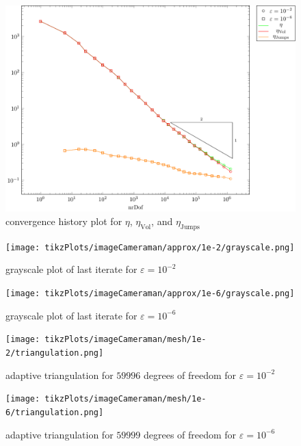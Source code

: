 \documentclass[draft=false,twoside,12pt]{scrreprt}
\begin{document}
\begin{figure}[H]
	\centering
	\includegraphics[width=14cm]
  {tikzPlots/imageCameraman/convergence/eps1e-2And1e-6/fig.pdf}
  \caption{convergence history plot for $\eta$,
  $\eta_\text{Vol}$, and $\eta_\text{Jumps}$}
\end{figure}

\begin{minipage}[t]{0.5\textwidth}
  \begin{figure}[H]
	  \centering
		\texttt{[image: tikzPlots/imageCameraman/approx/1e-2/grayscale.png]}
    \caption{grayscale plot of last iterate for $\varepsilon = 10^{-2}$}
  \end{figure}
\end{minipage}
\begin{minipage}[t]{0.5\textwidth}
  \begin{figure}[H]
	  \centering
		\texttt{[image: tikzPlots/imageCameraman/approx/1e-6/grayscale.png]}
    \caption{grayscale plot of last iterate for $\varepsilon = 10^{-6}$}
  \end{figure}
\end{minipage}

\begin{minipage}[t]{0.5\textwidth}
  \begin{figure}[H]
	  \centering
		\texttt{[image: tikzPlots/imageCameraman/mesh/1e-2/triangulation.png]}
    \caption{adaptive triangulation for $59996$ degrees of freedom for
      $\varepsilon = 10^{-2}$}
  \end{figure}
\end{minipage}
\begin{minipage}[t]{0.5\textwidth}
  \begin{figure}[H]
	  \centering
		\texttt{[image: tikzPlots/imageCameraman/mesh/1e-6/triangulation.png]}
    \caption{adaptive triangulation for $59999$ degrees of freedom for
      $\varepsilon = 10^{-6}$}
  \end{figure}
\end{minipage}
\end{document}
